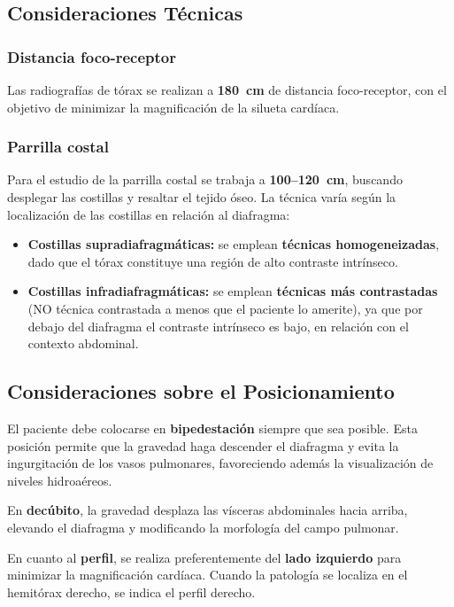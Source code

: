 \subsection*{Consideraciones Técnicas}

\subsubsection*{Distancia foco-receptor}

Las radiografías de tórax se realizan a \textbf{180~cm} de distancia foco-receptor,
con el objetivo de minimizar la magnificación de la silueta cardíaca.

\subsubsection*{Parrilla costal}

Para el estudio de la parrilla costal se trabaja a \textbf{100--120~cm}, buscando
desplegar las costillas y resaltar el tejido óseo. La técnica varía según la
localización de las costillas en relación al diafragma:

\begin{itemize}
    \item \textbf{Costillas supradiafragmáticas:} se emplean \textbf{técnicas homogeneizadas},
    dado que el tórax constituye una región de alto contraste intrínseco.
    \item \textbf{Costillas infradiafragmáticas:} se emplean \textbf{técnicas más contrastadas} (NO técnica contrastada a menos que el paciente lo amerite),
    ya que por debajo del diafragma el contraste intrínseco es bajo, en relación
    con el contexto abdominal.
\end{itemize}

\subsection*{Consideraciones sobre el Posicionamiento}

El paciente debe colocarse en \textbf{bipedestación} siempre que sea posible. Esta
posición permite que la gravedad haga descender el diafragma y evita la ingurgitación
de los vasos pulmonares, favoreciendo además la visualización de niveles hidroaéreos.

En \textbf{decúbito}, la gravedad desplaza las vísceras abdominales hacia arriba,
elevando el diafragma y modificando la morfología del campo pulmonar.

En cuanto al \textbf{perfil}, se realiza preferentemente del \textbf{lado izquierdo}
para minimizar la magnificación cardíaca. Cuando la patología se localiza en el
hemitórax derecho, se indica el perfil derecho.

